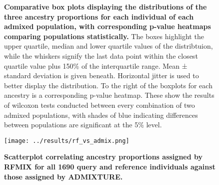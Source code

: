 \documentclass[11pt]{article}
\begin{document}




\begin{figure}[ht!]%
    \centering
     \hspace*{0em}
        \vspace{-0.6cm}
        \caption{\textbf{
            Comparative box plots displaying the distributions of the three ancestry proportions for each individual of each admixed population, with corresponding p-value heatmaps comparing populations statistically.
        }
            The boxes highlight the upper quartile, median and lower quartile values of the distribtuion, while the whiskers signify the last data point within the closest quartile value plus 150\% of the interquartile range. Mean ± standard deviation is given beneath. Horizontal jitter is used to better display the distribution. To the right of the boxplots for each ancestry is a corresponding p-value heatmap. These show the results of wilcoxon tests conducted between every combination of two admixed populations, with shades of blue indicating differences between populations are significant at the 5\% level.
        }
\end{figure}




\begin{figure}[htb!]%
    \centering
    \texttt{[image: ../results/rf\_vs\_admix.png]} 
    \vspace{.2cm}
    \caption{\textbf{
        Scatterplot correlating ancestry proportions assigned by RFMIX for all 1690 query and reference individuals against those assigned by ADMIXTURE.
    }
    }
\end{figure}
\end{document}

